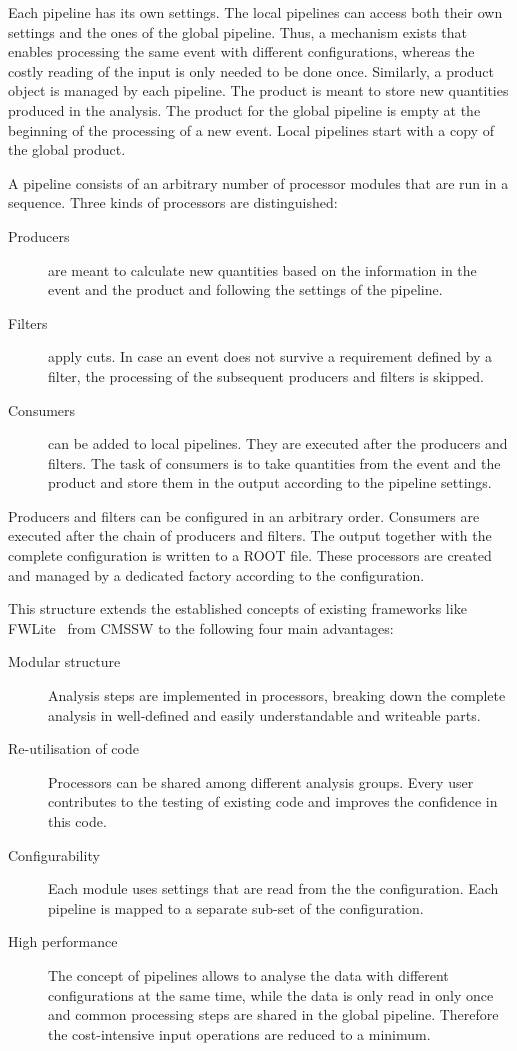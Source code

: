 \documentclass[3p]{elsarticle}
\begin{document}
Each pipeline has its own settings. The local pipelines can access both their own settings and the ones of the global pipeline. Thus, a mechanism exists that enables processing the same event with different configurations, whereas the costly reading of the input is only needed to be done once. Similarly, a product object is managed by each pipeline. The product is meant to store new quantities produced in the analysis. The product for the global pipeline is empty at the beginning of the processing of a new event. Local pipelines start with a copy of the global product.

A pipeline consists of an arbitrary number of processor modules that are run in a sequence. Three kinds of processors are distinguished:
\begin{description}
\item[Producers] are meant to calculate new quantities based on the information in the event and the product and following the settings of the pipeline.
\item[Filters] apply cuts. In case an event does not survive a requirement defined by a filter, the processing of the subsequent producers and filters is skipped.
\item[Consumers] can be added to local pipelines. They are executed after the producers and filters. The task of consumers is to take quantities from the event and the product and store them in the output according to the pipeline settings.
\end{description}
Producers and filters can be configured in an arbitrary order. Consumers are executed after the chain of producers and filters. The output together with the complete configuration is written to a ROOT file. These processors are created and managed by a dedicated factory according to the configuration.

This structure extends the established concepts of existing frameworks like FWLite~\cite{FWLite} from CMSSW to the following four main advantages:
\begin{description}
\item[Modular structure] Analysis steps are implemented in processors, breaking down the complete analysis in well-defined and easily understandable and writeable parts.
\item[Re-utilisation of code] Processors can be shared among different analysis groups. Every user contributes to the testing of existing code and improves the confidence in this code.
\item[Configurability] Each module uses settings that are read from the the configuration. Each pipeline is mapped to a separate sub-set of the configuration.
\item[High performance] The concept of pipelines allows to analyse the data with different configurations at the same time, while the data is only read in only once and common processing steps are shared in the global pipeline. Therefore the cost-intensive input operations are reduced to a minimum.
\end{description}
\end{document}
